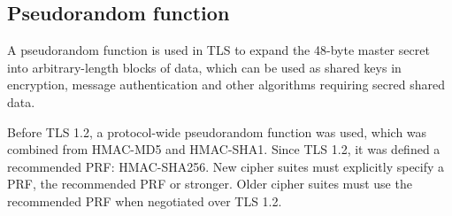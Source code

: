 \subsection{Pseudorandom function}

A pseudorandom function is used in TLS to expand the 48-byte master secret into arbitrary-length blocks of data, which can be used as shared keys in encryption, message authentication and other algorithms requiring secred shared data.

Before TLS 1.2, a protocol-wide pseudorandom function was used, which was combined from HMAC-MD5 and HMAC-SHA1. Since TLS 1.2, it was defined a recommended PRF: HMAC-SHA256. New cipher suites must explicitly specify a PRF, the recommended PRF or stronger. Older cipher suites must use the recommended PRF when negotiated over TLS 1.2.
